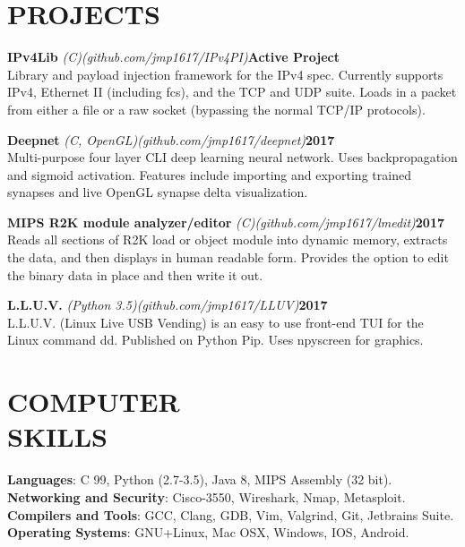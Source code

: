 \documentclass[line,margin]{res}
\begin{document}
\begin{resume}
\section{PROJECTS}
\par
    {\textbf{IPv4Lib}}
    {\sl (C)}{\sl (github.com/jmp1617/IPv4PI)}\hfill \textbf{Active Project}\\ 
    Library and payload injection framework for the IPv4 spec. Currently 
    supports IPv4, Ethernet II (including fcs), and the TCP and UDP suite. Loads 
    in a packet from either a file or a raw socket (bypassing the normal 
    TCP/IP protocols).
\par
    {\textbf{Deepnet}}
    {\sl (C, OpenGL)}{\sl (github.com/jmp1617/deepnet)}\hfill \textbf{2017}\\ 
    Multi-purpose four layer CLI deep learning neural network. Uses
    backpropagation and sigmoid activation. Features include importing and 
    exporting trained synapses and live OpenGL synapse delta visualization.
\par
    {\textbf{MIPS R2K module analyzer/editor}}
    {\sl (C)}{\sl (github.com/jmp1617/lmedit)}\hfill \textbf{2017}\\
    Reads all sections of R2K load or object module into dynamic memory, 
    extracts the data, and then displays in human readable form. Provides the 
    option to edit the binary data in place and then write it out.
\par
    {\textbf{L.L.U.V.}}
    {\sl (Python 3.5)}{\sl (github.com/jmp1617/LLUV)}\hfill \textbf{2017}\\ 
    L.L.U.V. (Linux Live USB Vending) is an easy to use front-end TUI for the 
    Linux command dd. Published on Python Pip. Uses npyscreen for graphics.

\section{COMPUTER\\SKILLS}
\textbf{Languages}: C 99, Python (2.7-3.5), Java 8, MIPS Assembly (32 bit).
\\
\textbf{Networking and Security}: Cisco-3550, Wireshark, Nmap, Metasploit.  
\\
\textbf{Compilers and Tools}: GCC, Clang, GDB, Vim, Valgrind, Git, 
Jetbrains Suite. 
\\
\textbf{Operating Systems}: 
GNU+Linux, Mac OSX, Windows, IOS, Android.


\end{resume}
\end{document}
